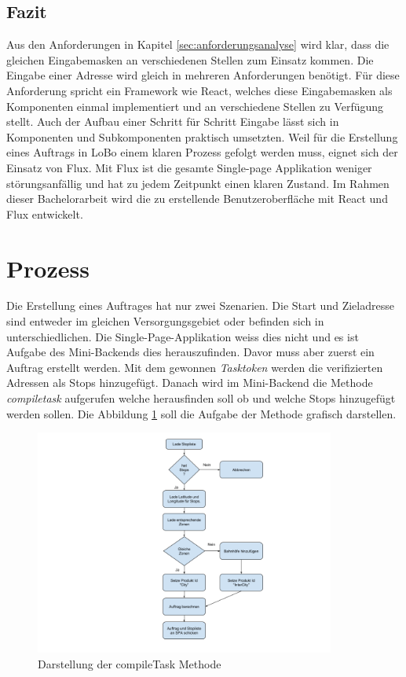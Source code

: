 \subsection{Fazit}
Aus den Anforderungen in Kapitel \ref{sec:anforderungsanalyse} wird klar, dass die gleichen Eingabemasken an verschiedenen Stellen zum Einsatz kommen. Die Eingabe einer Adresse wird gleich in mehreren Anforderungen benötigt. Für diese Anforderung spricht ein Framework wie React, welches diese Eingabemasken als Komponenten einmal implementiert und an verschiedene Stellen zu Verfügung stellt. Auch der Aufbau einer Schritt für Schritt Eingabe lässt sich in Komponenten und Subkomponenten praktisch umsetzten. Weil für die Erstellung eines Auftrags in LoBo einem klaren Prozess gefolgt werden muss, eignet sich der Einsatz von Flux. Mit Flux ist die gesamte Single-page Applikation weniger störungsanfällig und hat zu jedem Zeitpunkt einen klaren Zustand. Im Rahmen dieser Bachelorarbeit wird die zu erstellende Benutzeroberfläche mit React und Flux entwickelt.

\section{Prozess}
Die Erstellung eines Auftrages hat nur zwei Szenarien. Die Start und Zieladresse sind entweder im gleichen Versorgungsgebiet oder befinden sich in unterschiedlichen. Die Single-Page-Applikation weiss dies nicht und es ist Aufgabe des Mini-Backends dies herauszufinden. Davor muss aber zuerst ein Auftrag erstellt werden. Mit dem gewonnen \textit{Tasktoken} werden die verifizierten Adressen als Stops hinzugefügt. Danach wird im Mini-Backend die Methode \textit{compiletask} aufgerufen welche herausfinden soll ob und welche Stops hinzugefügt werden sollen. Die Abbildung \ref{fig:compiletask} soll die Aufgabe der Methode grafisch darstellen.

\begin{figure}[ht]
	\centering
  \includegraphics[width=0.88\textwidth]{images/compileTask.png}
	\caption{Darstellung der compileTask Methode}
	\label{fig:compiletask}
\end{figure}

